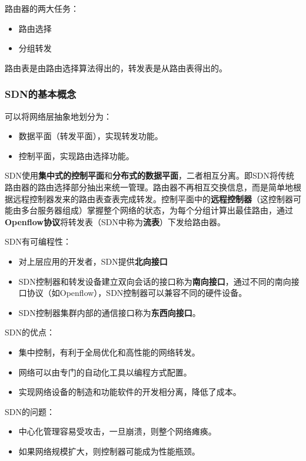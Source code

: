 \documentclass[12pt, a4paper, oneside]{ctexart}
\begin{document}
路由器的两大任务：
\begin{itemize}
    \item 路由选择
    \item 分组转发
\end{itemize}

路由表是由路由选择算法得出的，转发表是从路由表得出的。

\subsubsection{SDN的基本概念}

可以将网络层抽象地划分为：
\begin{itemize}
    \item 数据平面（转发平面），实现转发功能。
    \item 控制平面，实现路由选择功能。
\end{itemize}

SDN使用\textbf{集中式的控制平面}和\textbf{分布式的数据平面}，二者相互分离。即SDN将传统路由器的路由选择部分抽出来统一管理。路由器不再相互交换信息，而是简单地根据远程控制器发来的路由表查表完成转发。控制平面中的\textbf{远程控制器}（这控制器可能由多台服务器组成）掌握整个网络的状态，为每个分组计算出最佳路由，通过\textbf{Openflow协议}将转发表（SDN中称为\textbf{流表}）下发给路由器。

SDN有可编程性：
\begin{itemize}
    \item 对上层应用的开发者，SDN提供\textbf{北向接口}
    \item SDN控制器和转发设备建立双向会话的接口称为\textbf{南向接口}，通过不同的南向接口协议（如Openflow），SDN控制器可以兼容不同的硬件设备。
    \item SDN控制器集群内部的通信接口称为\textbf{东西向接口}。
\end{itemize}

SDN的优点：
\begin{itemize}
    \item 集中控制，有利于全局优化和高性能的网络转发。
    \item 网络可以由专门的自动化工具以编程方式配置。
    \item 实现网络设备的制造和功能软件的开发相分离，降低了成本。
\end{itemize}

SDN的问题：
\begin{itemize}
    \item 中心化管理容易受攻击，一旦崩溃，则整个网络瘫痪。
    \item 如果网络规模扩大，则控制器可能成为性能瓶颈。
\end{itemize}
\end{document}
